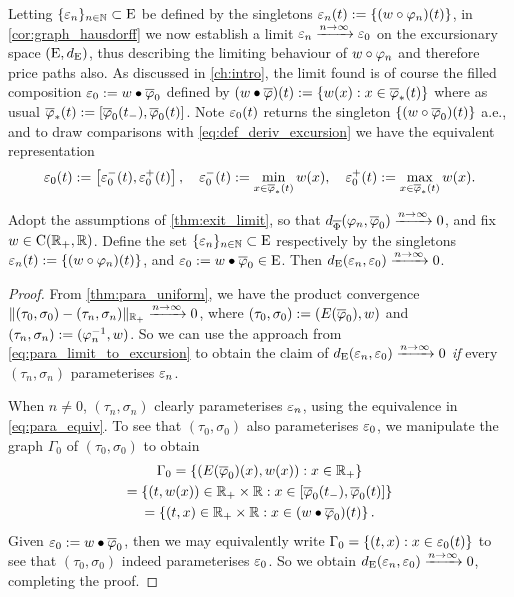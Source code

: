 Letting $\{\varepsilon_n\}_{n\in\mathbb{N}}\subset\mathrm{E}$ be defined by the singletons $\varepsilon_n(t):=\{(w\circ\varphi_n)(t)\}$, in \autoref{cor:graph_hausdorff} we now establish a limit $\varepsilon_n\xrightarrow{n\to\infty}\varepsilon_0$ on the excursionary space $(\mathrm{E},d_{\mathrm{E}})$, thus describing the limiting behaviour of $w\circ\varphi_n$ and therefore price paths also. As discussed in \autoref{ch:intro}, the limit found is of course the filled composition $\varepsilon_0:=w\bullet\overline{\varphi}_0$ defined by $(w\bullet\overline{\varphi})(t) := \{w(x):x\in\overline{\varphi}_*(t)\}$ where as usual $\overline{\varphi}_*(t):=[\overline{\varphi}_0(t_-),\overline{\varphi}_0(t)]$. Note $\varepsilon_0(t)$ returns the singleton $\{(w\circ\overline{\varphi}_0)(t)\}$ a.e., and to draw comparisons with \autoref{eq:def_deriv_excursion} we have the equivalent representation
\begin{equation}\label{eq:def_comp_excursion}
    \varepsilon_0(t) := \left[\varepsilon_0^-(t), \varepsilon_0^+(t)\right],\quad \varepsilon_0^-(t):=\min_{x\in\overline{\varphi}_*(t)} w(x),\quad \varepsilon_0^+(t):=\max_{x\in\overline{\varphi}_*(t)} w(x).
\end{equation}

\begin{theorem}\label{cor:graph_hausdorff}
    Adopt the assumptions of \autoref{thm:exit_limit}, so that $d_{\overline{\Phi}}(\varphi_n,\overline{\varphi}_0)\xrightarrow{n\to\infty}0$, and fix $w\in\mathrm{C}(\mathbb{R}_+,\mathbb{R})$. Define the set $\{\varepsilon_n\}_{n\in\mathbb{N}}\subset\mathrm{E}$ respectively by the singletons $\varepsilon_n(t):=\{(w\circ\varphi_n)(t)\}$, and $\varepsilon_0:=w\bullet\overline{\varphi}_0\in\mathrm{E}$. Then $d_{\mathrm{E}}(\varepsilon_n,\varepsilon_0)\xrightarrow{n\to\infty}0$.
\end{theorem}
\begin{proof}
    From \autoref{thm:para_uniform}, we have the product convergence $\Vert(\tau_0,\sigma_0) - (\tau_n,\sigma_n) \Vert_{\mathbb{R}_+} \xrightarrow{n\to\infty}  0$, where $(\tau_0,\sigma_0):=(E(\overline{\varphi}_0),w)$ and $(\tau_n,\sigma_n):=(\varphi^{-1}_n,w)$. So we can use the approach from \autoref{eq:para_limit_to_excursion} to obtain the claim of $d_{\mathrm{E}}(\varepsilon_n,\varepsilon_0)\xrightarrow{n\to\infty}0$ \emph{if} every $(\tau_n,\sigma_n)$ parameterises $\varepsilon_n$.

    When $n\neq0$, $(\tau_n,\sigma_n)$ clearly parameterises $\varepsilon_n$, using the equivalence in \autoref{eq:para_equiv}. To see that $(\tau_0,\sigma_0)$ also parameterises $\varepsilon_0$, we manipulate the graph $\Gamma_0$ of $(\tau_0,\sigma_0)$ to obtain
    \begin{multline}
        \Gamma_0 = \left\{(E(\overline{\varphi}_0)(x),w(x)): x\in\mathbb{R}_+\right\}\\
        = \left\{(t,w(x))\in\mathbb{R}_+\times\mathbb{R}: x\in[\overline{\varphi}_0(t_-),\overline{\varphi}_0(t)]\right\}\\
        = \left\{(t,x)\in\mathbb{R}_+\times\mathbb{R}: x\in(w\bullet\overline{\varphi}_0)(t)\right\}.
    \end{multline}
    Given $\varepsilon_0:=w\bullet\overline{\varphi}_0$, then we may equivalently write $\Gamma_0=\{(t,x):x\in\varepsilon_0(t)\}$ to see that $(\tau_0,\sigma_0)$ indeed parameterises $\varepsilon_0$. So we obtain $d_{\mathrm{E}}(\varepsilon_n,\varepsilon_0)\xrightarrow{n\to\infty}0$, completing the proof.
\end{proof}

